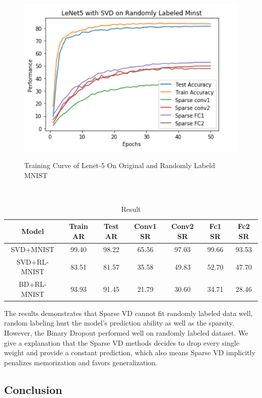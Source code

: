 \documentclass{article}
\begin{document}
\begin{figure}[ht]
{				\centering
				\includegraphics[scale=0.25]{pic/exp4-3.png}
				\label{fig:exp4-3}
			}
			\caption{Training Curve of Lenet-5 On Original and Randomly Labeld MNIST}
			\label{fig:exp4}
		\end{figure}\\

		\begin{table}[!htbp]
			\centering
			\caption{Result}
			\begin{tabular}{ccccccc}
				\toprule
				Model& Train AR& Test AR& Conv1 SR& Conv2 SR& Fc1 SR& Fc2 SR\\
				\midrule
				SVD+MNIST& 99.40& 98.22& 65.56& 97.03& 99.66& 93.53\\
				SVD+RL-MNIST& 83.51& 81.57& 35.58& 49.83& 52.70& 47.70\\ 
				BD+RL-MNIST& 93.93& 91.45& 21.79& 30.60& 34.71& 28.46\\
				\bottomrule
			\end{tabular}
		\end{table}
	The results demonstrates that Sparse VD cannot fit randomly labeled data well, random labeling hurt the model’s prediction ability as well as the sparsity. However, the Binary Dropout performed well on randomly labeled dataset. We give a explanation that the Sparse VD methods decides to drop every single weight and provide a constant prediction, which also means Sparse VD implicitly penalizes memorization and favors generalization.\\

	\subsection{Conclusion}
\end{document}
